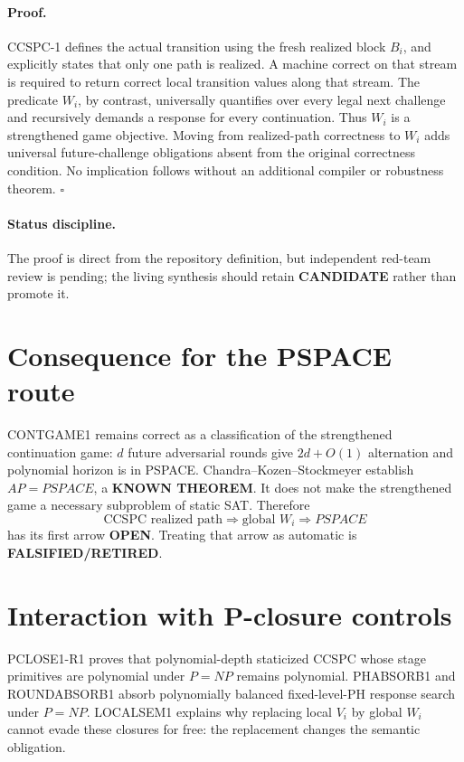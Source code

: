 \documentclass[11pt]{article}
\begin{document}
\paragraph{Proof.}
CCSPC-1 defines the actual transition using the fresh realized block \(B_i\), and explicitly states that only one path is realized. A machine correct on that stream is required to return correct local transition values along that stream. The predicate \(W_i\), by contrast, universally quantifies over every legal next challenge and recursively demands a response for every continuation. Thus \(W_i\) is a strengthened game objective. Moving from realized-path correctness to \(W_i\) adds universal future-challenge obligations absent from the original correctness condition. No implication follows without an additional compiler or robustness theorem. \(\square\)

\paragraph{Status discipline.}
The proof is direct from the repository definition, but independent red-team review is pending; the living synthesis should retain \textbf{CANDIDATE} rather than promote it.

\section*{Consequence for the PSPACE route}
CONTGAME1 remains correct as a classification of the strengthened continuation game: \(d\) future adversarial rounds give \(2d+O(1)\) alternation and polynomial horizon is in PSPACE. Chandra--Kozen--Stockmeyer establish \(AP=PSPACE\), a \textbf{KNOWN THEOREM}. It does not make the strengthened game a necessary subproblem of static SAT. Therefore
\[
\text{CCSPC realized path}\Rightarrow\text{global }W_i\Rightarrow PSPACE
\]
has its first arrow \textbf{OPEN}. Treating that arrow as automatic is \textbf{FALSIFIED/RETIRED}.

\section*{Interaction with P-closure controls}
PCLOSE1-R1 proves that polynomial-depth staticized CCSPC whose stage primitives are polynomial under \(P=NP\) remains polynomial. PHABSORB1 and ROUNDABSORB1 absorb polynomially balanced fixed-level-PH response search under \(P=NP\). LOCALSEM1 explains why replacing local \(V_i\) by global \(W_i\) cannot evade these closures for free: the replacement changes the semantic obligation.
\end{document}
